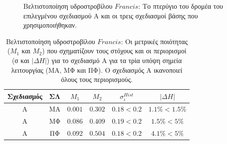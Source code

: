 \begin{figure}[h!]
\begin{minipage}[b]{1\linewidth}
 \centering
\end{minipage}
\caption{Βελτιστοποίηση υδροστροβίλου $Francis$: Το πτερύγιο του δρομέα του επιλεγμένου σχεδιασμού Α και οι τρεις σχεδιασμοί βάσης που χρησιμοποιήθηκαν.}
\label{design-bases-a}
\end{figure}

\begin{table}[h!]
\begin{center}
\begin{tabular}{ |c|c|c|c|c|c| }
\hline
Σχεδιασμός & ΣΛ & $M_1$ & $M_2$  &  $\sigma_i^{Hist}$ & $|\Delta H|$\\
\hline
A & ΜΑ & $0.001$ & $0.302$ & $0.18 < 0.2$ & $ 1.1\% <1.5\%$ \\
A & ΜΦ & $0.086$ & $0.409$ & $0.19 < 0.2$ & $ 1.5\% <5\%$ \\
A & ΠΦ & $0.092$ & $0.504$ & $0.18 < 0.2$ & $ 4.1\% <5\%$  \\
\hline
\end{tabular}
\caption{Βελτιστοποίηση υδροστροβίλου $Francis$: Οι μετρικές ποιότητας ($M_1$ και $M_2$) που σχηματίζουν τους στόχους και οι περιορισμοί (σ και $|\Delta H|$) για το σχεδιασμό Α για τα τρία  υπόψη σημεία λειτουργίας (ΜΑ, ΜΦ και ΠΦ). Ο σχεδιασμός Α ικανοποιεί όλους τους περιορισμούς.}
\label{Asum}
\end{center}
\end{table}


